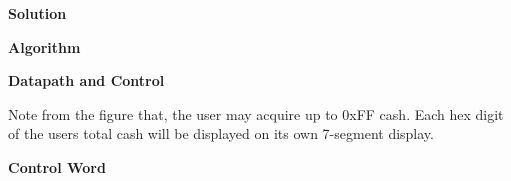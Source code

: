 \begin{enumerate}
        \begin{onlysolution}  \textbf{Solution} \itshape{

                \textbf{ Algorithm}


                \textbf{ Datapath and Control}

                \begin{figure}[ht]
                \end{figure}

                Note from the figure that, the user may acquire
                up to 0xFF cash.  Each hex digit of the users total cash will
                be displayed on its own 7-segment display.

                \textbf{ Control Word}

}
\end{onlysolution}
\end{enumerate}
